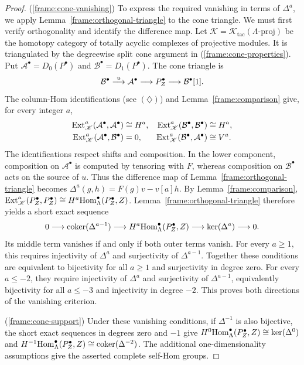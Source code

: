 \documentclass[11pt]{article}
\begin{document}
\begin{proof}
\textup{(\ref{frame:cone-vanishing})}
To express the required vanishing in terms of $\Delta^a$, we apply
Lemma~\ref{frame:orthogonal-triangle} to the cone triangle.
We must first verify orthogonality and identify the difference map.
Let $\mathscr K=\mathscr K_{\mathrm{tac}}(\Lambda\text{-}\mathrm{proj})$
be the homotopy category of totally acyclic complexes of
projective modules. It is triangulated by the degreewise split
cone argument in \textup{(\ref{frame:cone-properties})}.
Put $\mathcal A^\bullet=D_0(P^\bullet)$ and
$\mathcal B^\bullet=D_1(P^\bullet)$. The cone triangle is
\[
 \mathcal B^\bullet\stackrel{u}{\longrightarrow}\mathcal A^\bullet
 \longrightarrow P_Z^\bullet\longrightarrow\mathcal B^\bullet[1].
\]
The column-Hom identifications (see $(\diamondsuit)$) and Lemma~\ref{frame:comparison}
give, for every integer $a$,
\begin{equation*}
 \begin{aligned}
 {\rm Ext}_{\mathscr K}^a(\mathcal A^\bullet,\mathcal A^\bullet)&\cong H^a,
 &{\rm Ext}_{\mathscr K}^a(\mathcal B^\bullet,\mathcal B^\bullet)&\cong H^a,\\
 {\rm Ext}_{\mathscr K}^a(\mathcal A^\bullet,\mathcal B^\bullet)&=0,
 &{\rm Ext}_{\mathscr K}^a(\mathcal B^\bullet,\mathcal A^\bullet)&\cong V^a.
 \end{aligned}
\end{equation*}
The identifications respect shifts and composition.
In the lower component, composition on $\mathcal A^\bullet$ is
computed by tensoring with $F$, whereas composition on
$\mathcal B^\bullet$ acts on the source of $u$.
Thus the difference map of Lemma~\ref{frame:orthogonal-triangle}
becomes $\Delta^a(g,h)=F(g)v-v[a]h$.
By Lemma~\ref{frame:comparison}, ${\rm Ext}_{\mathscr K}^a(P_Z^\bullet,P_Z^\bullet)
\cong H^a{\rm Hom}_\Lambda^\bullet(P_Z^\bullet,Z)$.
Lemma~\ref{frame:orthogonal-triangle} therefore yields a short
exact sequence
\[
 0\longrightarrow\operatorname{coker}(\Delta^{a-1})
 \longrightarrow H^a{\rm Hom}_\Lambda^\bullet(P_Z^\bullet,Z)
 \longrightarrow\ker(\Delta^a)\longrightarrow0.
\]
Its middle term vanishes if and only if both outer terms vanish.
For every $a\geq1$, this requires injectivity of $\Delta^a$ and
surjectivity of $\Delta^{a-1}$. Together these conditions are
equivalent to bijectivity for all $a\geq1$ and surjectivity in
degree zero. For every $a\leq-2$, they require injectivity of
$\Delta^a$ and surjectivity of $\Delta^{a-1}$, equivalently
bijectivity for all $a\leq-3$ and injectivity in degree $-2$.
This proves both directions of the vanishing criterion.

\textup{(\ref{frame:cone-support})}
Under these vanishing conditions, if $\Delta^{-1}$ is also
bijective, the short exact sequences in degrees zero and $-1$ give
$H^0{\rm Hom}_\Lambda^\bullet(P_Z^\bullet,Z)\cong\ker(\Delta^0)$ and
$H^{-1}{\rm Hom}_\Lambda^\bullet(P_Z^\bullet,Z)\cong\operatorname{coker}(\Delta^{-2})$.
The additional one-dimensionality assumptions give the asserted
complete self-Hom groups.
\end{proof}
\end{document}
